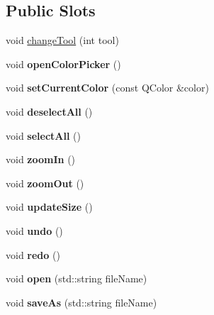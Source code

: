\subsection*{Public Slots}
\begin{DoxyCompactItemize}
\item 
void \hyperlink{classCanvasWidget_a10d481976a36a4e489f42d2b5dfa4662}{change\-Tool} (int tool)
\item 
\hypertarget{classCanvasWidget_a24a75e8958b478656824d1d985d2d64d}{void {\bfseries open\-Color\-Picker} ()}\label{classCanvasWidget_a24a75e8958b478656824d1d985d2d64d}

\item 
\hypertarget{classCanvasWidget_a3dbc33d4382ea5295af8008760f123f3}{void {\bfseries set\-Current\-Color} (const Q\-Color \&color)}\label{classCanvasWidget_a3dbc33d4382ea5295af8008760f123f3}

\item 
\hypertarget{classCanvasWidget_a6a39b7120018202a7fc095a7638e8c90}{void {\bfseries deselect\-All} ()}\label{classCanvasWidget_a6a39b7120018202a7fc095a7638e8c90}

\item 
\hypertarget{classCanvasWidget_a692ef366f79d844dabc58803a82ba2d4}{void {\bfseries select\-All} ()}\label{classCanvasWidget_a692ef366f79d844dabc58803a82ba2d4}

\item 
\hypertarget{classCanvasWidget_afd4a461b8779e2d692a08647e655bc1e}{void {\bfseries zoom\-In} ()}\label{classCanvasWidget_afd4a461b8779e2d692a08647e655bc1e}

\item 
\hypertarget{classCanvasWidget_a0a19a82e3f4fbe354b779ff014e55ff2}{void {\bfseries zoom\-Out} ()}\label{classCanvasWidget_a0a19a82e3f4fbe354b779ff014e55ff2}

\item 
\hypertarget{classCanvasWidget_a05e567b5107bad5938e32a650c7696a6}{void {\bfseries update\-Size} ()}\label{classCanvasWidget_a05e567b5107bad5938e32a650c7696a6}

\item 
\hypertarget{classCanvasWidget_a9617418393fa64b4d662c0523acd98a2}{void {\bfseries undo} ()}\label{classCanvasWidget_a9617418393fa64b4d662c0523acd98a2}

\item 
\hypertarget{classCanvasWidget_ae6032a56c6be372d9b48fea14dcb1954}{void {\bfseries redo} ()}\label{classCanvasWidget_ae6032a56c6be372d9b48fea14dcb1954}

\item 
\hypertarget{classCanvasWidget_a0ccbb1b2140e5bbadc21ffe0684bd848}{void {\bfseries open} (std\-::string file\-Name)}\label{classCanvasWidget_a0ccbb1b2140e5bbadc21ffe0684bd848}

\item 
\hypertarget{classCanvasWidget_ac7465ba42b77a5a9a36af19073e0279a}{void {\bfseries save\-As} (std\-::string file\-Name)}\label{classCanvasWidget_ac7465ba42b77a5a9a36af19073e0279a}

\end{DoxyCompactItemize}
